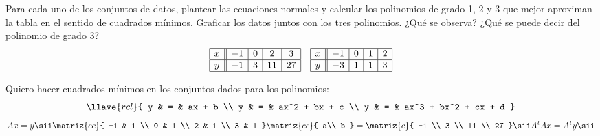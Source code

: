 \begin{enunciado}{\ejercicio}
  Para cada uno de los conjuntos de datos, plantear las ecuaciones normales y calcular los polinomios de grado 1, 2 y 3 que
  mejor aproximan la tabla en el sentido de cuadrados mínimos. Graficar los datos juntos con los tres polinomios.
  ¿Qué se observa? ¿Qué se puede decir del polinomio de grado 3?
  $$
    \begin{array}{|c||c|c|c|c|}
      \hline
      x & -1 & 0 & 2  & 3  \\ \hline
      y & -1 & 3 & 11 & 27 \\ \hline
    \end{array}
    \quad
    \begin{array}{|c||c|c|c|c|}
      \hline
      x & -1 & 0 & 1 & 2 \\ \hline
      y & -3 & 1 & 1 & 3 \\ \hline
    \end{array}
  $$
\end{enunciado}

Quiero hacer cuadrados mínimos en los conjuntos dados para los polinomios:
$$
  \llave{rcl}{
    y & = & ax + b  \\
    y & = & ax^2 + bx + c  \\
    y & = & ax^3 + bx^2 + cx + d
  }
$$
$$
  A x = y
  \sii
  \matriz{cc}{
    -1 & 1 \\
    0 & 1 \\
    2 & 1 \\
    3 & 1
  }
  \matriz{cc}{
    a\\
    b
  }
  =
  \matriz{c}{
    -1 \\
    3  \\
    11  \\
    27
  }
  \sii
  A^tAx = A^ty
  \sii

$$
